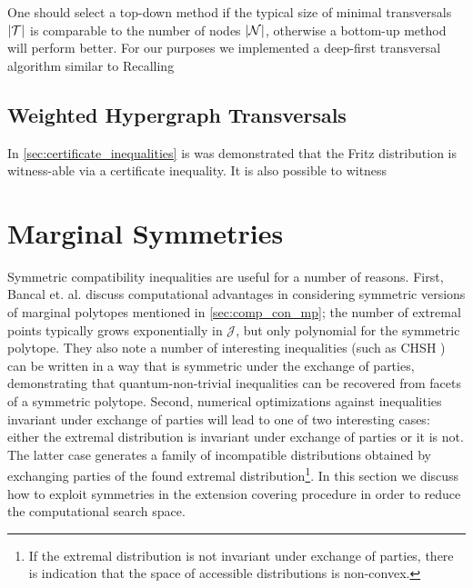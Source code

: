 \documentclass[aps, 10pt, english, twoside, pra, nofootinbib, longbibliography]{revtex4-1}
\theoremstyle{plain}
\theoremstyle{definition}
\theoremstyle{remark}
\newcommand{\nodes}{\mathcal{N}}
\newcommand{\trans}{\mathcal{T}}
\newcommand{\jointvar}{\mathcal{J}}
\begin{document}
    One should select a top-down method if the typical size of minimal transversals $\abs{\trans}$ is comparable to the number of nodes $\abs{\nodes}$, otherwise a bottom-up method will perform better.
    For our purposes we implemented a deep-first transversal algorithm similar to
    Recalling

    \subsection{Weighted Hypergraph Transversals}
    In \cref{sec:certificate_inequalities} is was demonstrated that the Fritz distribution is witness-able via a certificate inequality. It is also possible to witness

    \section{Marginal Symmetries}
    \label{sec:symmetry}
    Symmetric compatibility inequalities are useful for a number of reasons. First, Bancal et. al. \cite{Bancal_2010} discuss computational advantages in considering symmetric versions of marginal polytopes mentioned in \cref{sec:comp_con_mp}; the number of extremal points typically grows exponentially in $\jointvar$, but only polynomial for the symmetric polytope. They also note a number of interesting inequalities (such as CHSH \cite{CHSH_Original}) can be written in a way that is symmetric under the exchange of parties, demonstrating that quantum-non-trivial inequalities can be recovered from facets of a symmetric polytope. Second, numerical optimizations against inequalities invariant under exchange of parties will lead to one of two interesting cases: either the extremal distribution is invariant under exchange of parties or it is not. The latter case generates a family of incompatible distributions obtained by exchanging parties of the found extremal distribution\footnote{If the extremal distribution is not invariant under exchange of parties, there is indication that the space of accessible distributions is non-convex.}. In this section we discuss how to exploit symmetries in the extension covering procedure in order to reduce the computational search space. \\
\end{document}
